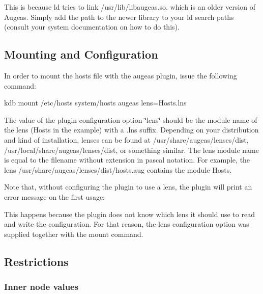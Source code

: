 This is because {\ttfamily ld} tries to link {\ttfamily /usr/lib/libaugeas.so.} which is an older version of Augeas. Simply add the path to the newer library to your ld search paths (consult your system documentation on how to do this).

\subsection*{Mounting and Configuration}

In order to mount the hosts file with the augeas plugin, issue the following command\+: \begin{DoxyVerb}kdb mount /etc/hosts system/hosts augeas lens=Hosts.lns
\end{DoxyVerb}


The value of the plugin configuration option \char`\"{}lens\char`\"{} should be the module name of the lens (Hosts in the example) with a \textquotesingle{}.lns\textquotesingle{} suffix. Depending on your distribution and kind of installation, lenses can be found at {\ttfamily /usr/share/augeas/lenses/dist}, {\ttfamily /usr/local/share/augeas/lenses/dist}, or something similar. The lens module name is equal to the filename without extension in pascal notation. For example, the lens {\ttfamily /usr/share/augeas/lenses/dist/hosts.aug} contains the module Hosts.

Note that, without configuring the plugin to use a lens, the plugin will print an error message on the first usage\+: 


This happens because the plugin does not know which lens it should use to read and write the configuration. For that reason, the lens configuration option was supplied together with the mount command.

\subsection*{Restrictions}

\subsubsection*{Inner node values}

